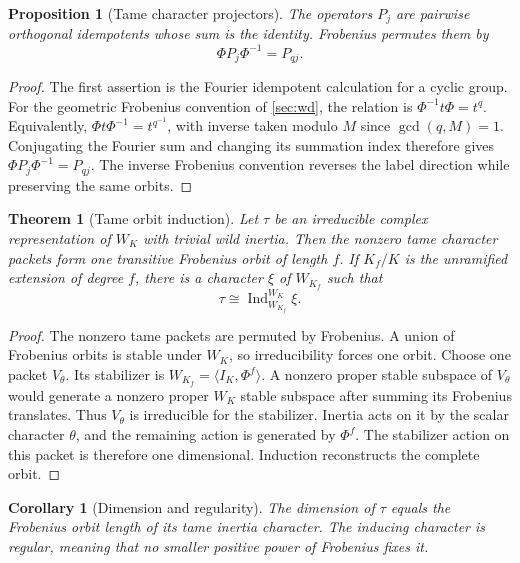 \documentclass[11pt]{amsart}
\newtheorem{theorem}{Theorem}[section]
\newtheorem{proposition}[proposition]{Proposition}
\newtheorem{corollary}[corollary]{Corollary}
\theoremstyle{definition}
\theoremstyle{remark}
\newcommand{\Ind}{\operatorname{Ind}}
\begin{document}
\begin{proposition}[Tame character projectors]\label{prop:tame_projectors}
The operators \(P_j\) are pairwise orthogonal idempotents whose sum is the identity. Frobenius permutes them by
\[
\Phi P_j\Phi^{-1}=P_{qj}.
\]
\end{proposition}

\begin{proof}
The first assertion is the Fourier idempotent calculation for a cyclic group. For the geometric Frobenius convention of \cref{sec:wd}, the relation is \(\Phi^{-1}t\Phi=t^q\). Equivalently, \(\Phi t\Phi^{-1}=t^{q^{-1}}\), with inverse taken modulo \(M\) since \(\gcd(q,M)=1\). Conjugating the Fourier sum and changing its summation index therefore gives \(\Phi P_j\Phi^{-1}=P_{qj}\). The inverse Frobenius convention reverses the label direction while preserving the same orbits.
\end{proof}

\begin{theorem}[Tame orbit induction]\label{thm:tame_induction}
Let \(\tau\) be an irreducible complex representation of \(W_K\) with trivial wild inertia. Then the nonzero tame character packets form one transitive Frobenius orbit of length \(f\). If \(K_f/K\) is the unramified extension of degree \(f\), there is a character \(\xi\) of \(W_{K_f}\) such that
\[
\boxed{
\tau\cong\Ind_{W_{K_f}}^{W_K}\xi.
}
\]
\end{theorem}

\begin{proof}
The nonzero tame packets are permuted by Frobenius. A union of Frobenius orbits is stable under \(W_K\), so irreducibility forces one orbit. Choose one packet \(V_\theta\). Its stabilizer is \(W_{K_f}=\langle I_K,\Phi^f\rangle\). A nonzero proper stable subspace of \(V_\theta\) would generate a nonzero proper \(W_K\) stable subspace after summing its Frobenius translates. Thus \(V_\theta\) is irreducible for the stabilizer. Inertia acts on it by the scalar character \(\theta\), and the remaining action is generated by \(\Phi^f\). The stabilizer action on this packet is therefore one dimensional. Induction reconstructs the complete orbit.
\end{proof}

\begin{corollary}[Dimension and regularity]\label{cor:tame_dimension}
The dimension of \(\tau\) equals the Frobenius orbit length of its tame inertia character. The inducing character is regular, meaning that no smaller positive power of Frobenius fixes it.
\end{corollary}
\end{document}
